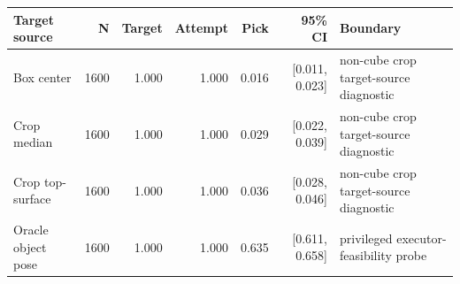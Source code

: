 \begin{tabular}{lrrrrrl}
\toprule
Target source & N & Target & Attempt & Pick & 95\% CI & Boundary \\
\midrule
Box center & 1600 & 1.000 & 1.000 & 0.016 & [0.011, 0.023] & non-cube crop target-source diagnostic \\
Crop median & 1600 & 1.000 & 1.000 & 0.029 & [0.022, 0.039] & non-cube crop target-source diagnostic \\
Crop top-surface & 1600 & 1.000 & 1.000 & 0.036 & [0.028, 0.046] & non-cube crop target-source diagnostic \\
Oracle object pose & 1600 & 1.000 & 1.000 & 0.635 & [0.611, 0.658] & privileged executor-feasibility probe \\
\bottomrule
\end{tabular}
